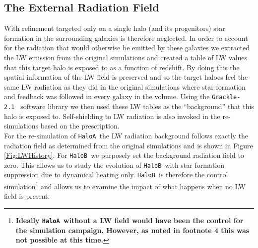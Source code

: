 \documentclass[twocolumn,iop,revtex4]{openjournal}
\newcommand{\grackle}{\texttt{Grackle-2.1~}}
\newcommand{\ha} {\texttt{HaloA~}}
\newcommand{\hb} {\texttt{HaloB~}}
\begin{document}
 \subsection{The External Radiation Field} \label{Sec:LWRadField}
 With refinement targeted only on a single halo (and its progenitors) star formation in the
 surrounding galaxies is therefore neglected. In order to account for the radiation that would
 otherwise be emitted by these galaxies we extracted the LW emission from the original simulations
 and created a table of LW values that this target halo is exposed to as a function of
 redshift. By doing this the spatial information of the LW field is preserved and so the target haloes feel the same LW radiation as they did in the original simulations where star formation and feedback was followed in every galaxy in the volume. Using the \grackle \citep{Grackle} software library we then used these LW tables as
 the ``background'' that this halo is exposed to. Self-shielding to LW radiation is also invoked in
 the re-simulations based on the \cite{Wolcott-Green_2011} prescription.\\
 \indent For the re-simulation of \ha the LW radiation background follows exactly the radiation
 field as determined from the original simulations and is shown in Figure \ref{Fig:LWHistory}.
 For \hb we purposely set the background radiation field to zero. This allows us to study the
 evolution of \hb with star formation suppression due to dynamical heating only. \hb is therefore
 the control simulation\footnote{\textbf{Ideally \ha without a LW field would have been the
     control for
   the simulation campaign. However, as noted in footnote 4 this was not possible at this
   time.}} and allows us to examine the impact of what happens when
 no LW field is present. 
 
\end{document}
